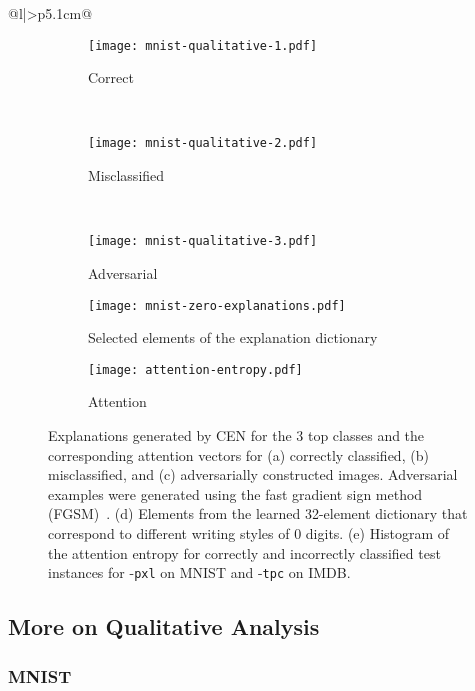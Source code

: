 \documentclass[twoside,11pt]{article}
\begin{document}
\begin{table}[t!]
\begin{tabular}[t]{@{}l|>{\raggedleft\arraybackslash}p{5.1cm}@{}}
\begin{figure}[ht]
\begin{subfigure}[b]{0.3308\linewidth}
    \texttt{[image: mnist-qualitative-1.pdf]}\caption{Correct}\label{fig:mnist-qualitative-correct}
\end{subfigure}
~
\begin{subfigure}[b]{0.3\linewidth}
    \texttt{[image: mnist-qualitative-2.pdf]}\caption{Misclassified}\label{fig:mnist-qualitative-incorrect}
\end{subfigure}
~
\begin{subfigure}[b]{0.3265\linewidth}
    \texttt{[image: mnist-qualitative-3.pdf]}\caption{Adversarial}\label{fig:mnist-qualitative-adversarial}
\end{subfigure}
\begin{subfigure}[b]{0.55\linewidth}
    \texttt{[image: mnist-zero-explanations.pdf]}\caption{Selected elements of the explanation dictionary}\label{fig:mnist-zero-explanations}
\end{subfigure}\begin{subfigure}[b]{0.45\linewidth}
    \texttt{[image: attention-entropy.pdf]}\caption{Attention}\label{fig:attention-entropy}
\end{subfigure}
\caption{Explanations generated by CEN for the 3 top classes and the corresponding attention vectors for (a) correctly classified, (b) misclassified, and (c) adversarially constructed images.
Adversarial examples were generated using the fast gradient sign method (FGSM)~\citep{papernot2016practical}.
(d) Elements from the learned 32-element dictionary that correspond to different writing styles of 0 digits.
(e) Histogram of the attention entropy for correctly and incorrectly classified test instances for {\CEN}-\texttt{pxl} on MNIST and {\CEN}-\texttt{tpc} on IMDB.
}\label{fig:mnist-plots}
\end{figure}
 
\subsection{More on Qualitative Analysis}
\label{app:qualitative-analysis}

\subsubsection{MNIST}


\end{tabular}
\end{table}
\end{document}
